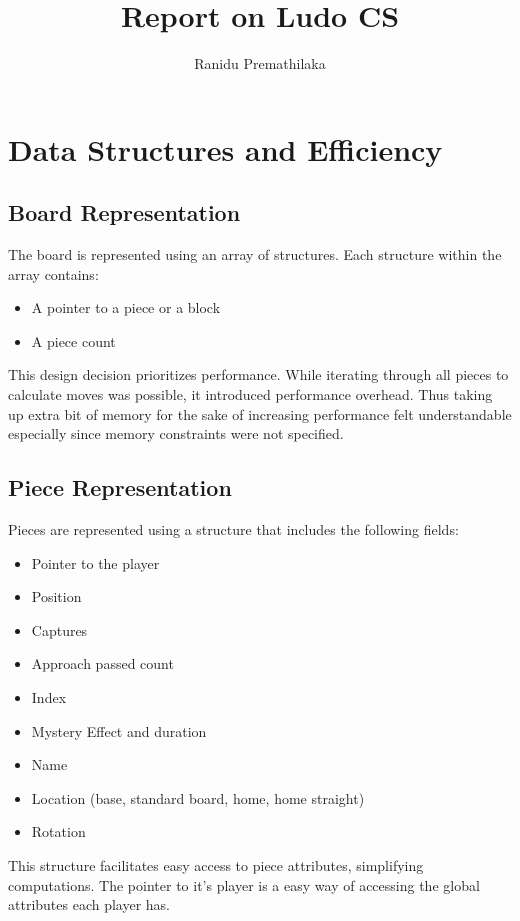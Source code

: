\documentclass{article}
\begin{document}
\title{Report on Ludo CS}
\author{Ranidu Premathilaka}
\maketitle

\section{Data Structures and Efficiency}

\subsection{Board Representation}

The board is represented using an array of structures. Each structure within the array contains:
\begin{itemize}
    \item A pointer to a piece or a block
    \item A piece count
\end{itemize}

This design decision prioritizes performance. While iterating through all pieces to calculate moves was possible, it introduced performance overhead. Thus taking up extra bit of memory for the sake of increasing performance felt understandable especially since memory constraints were not specified.

\subsection{Piece Representation}

Pieces are represented using a structure that includes the following fields:

\begin{itemize}
    \item Pointer to the player
    \item Position
    \item Captures
    \item Approach passed count
    \item Index
    \item Mystery Effect and duration
    \item Name
    \item Location (base, standard board, home, home straight)
    \item Rotation
\end{itemize}

This structure facilitates easy access to piece attributes, simplifying computations. The pointer to it's player is a easy way of accessing the global attributes each player has.
\end{document}
